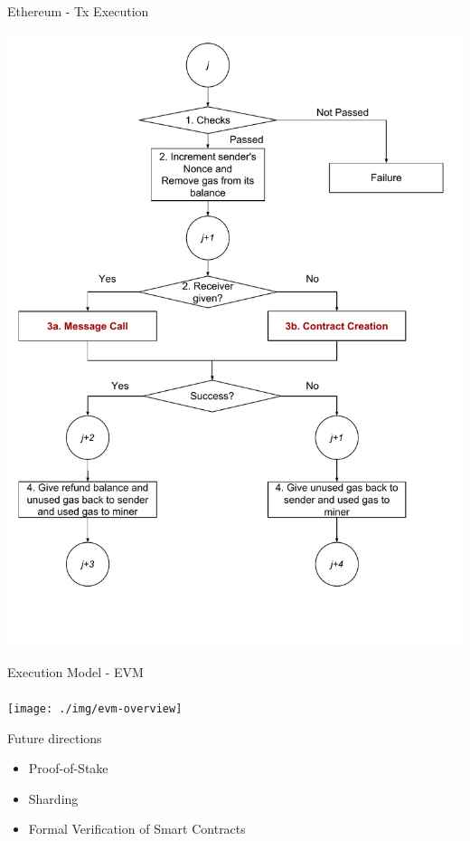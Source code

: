 \begin{frame}{Ethereum - Tx Execution}
\framesubtitle{\cite{bib:yellow}}
\begin{center}
\includegraphics[height=0.95\textheight]{./img/transaction-execution}
\end{center}
\end{frame}


\begin{frame}{Execution Model - EVM}
\framesubtitle{\cite{bib:yellow}}
\begin{center}
\texttt{[image: ./img/evm-overview]}
\end{center}
\end{frame}



\begin{frame}{Future directions}
\begin{itemize}
\item Proof-of-Stake
\item Sharding
\item Formal Verification of Smart Contracts
\end{itemize}
\end{frame}
